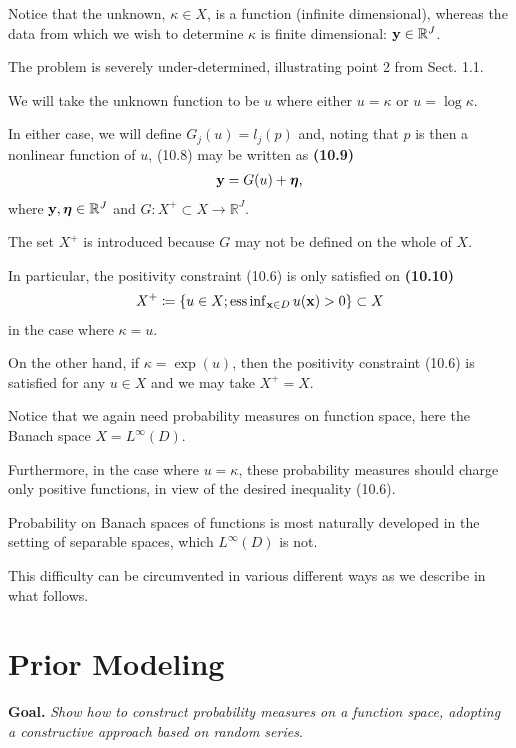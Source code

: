 \documentclass[oneside,11pt]{book}
\numberwithin{equation}{section}
\begin{document}
%
Notice that the unknown, $\kappa\in X$, is a function (infinite dimensional), whereas the data from which we wish to determine $\kappa$ is finite dimensional: ${\bf y}\in\mathbb{R}^J$.

The problem is severely under-determined, illustrating point 2 from Sect. 1.1.


We will take the unknown function to be $u$ where either $u = \kappa$ or $u = \log\kappa$.

In either case, we will define $G_j(u) = l_j(p)$ and, noting that $p$ is then a nonlinear function of $u$, (10.8) may be written as \textbf{(10.9)}
\begin{align*}
    {\bf y} = G(u) + \boldsymbol{\eta},
\end{align*}
where ${\bf y},\boldsymbol{\eta}\in\mathbb{R}^J$ and $G:X^+\subset X\to\mathbb{R}^J$.

The set $X^+$ is introduced because $G$ may not be defined on the whole of $X$.

In particular, the positivity constraint (10.6) is only satisfied on \textbf{(10.10)}
\begin{align*}
    X^+\coloneqq\left\{u\in X;\operatorname{ess\inf}_{{\bf x}\in D} u({\bf x}) > 0\right\}\subset X
\end{align*}
in the case where $\kappa = u$.

On the other hand, if $\kappa = \exp(u)$, then the positivity constraint (10.6) is satisfied for any $u\in X$ and we may take $X^+ = X$.

%
Notice that we again need probability measures on function space, here the Banach space $X = L^\infty(D)$.

Furthermore, in the case where $u = \kappa$, these probability measures should charge only positive functions, in view of the desired inequality (10.6).

Probability on Banach spaces of functions is most naturally developed in the setting of separable spaces, which $L^\infty(D)$ is not.

This difficulty can be circumvented in various different ways as we describe in what follows.

\section{Prior Modeling}
\textbf{Goal.} \textit{Show how to construct probability measures on a function space, adopting a constructive approach based on random series}.
\end{document}

